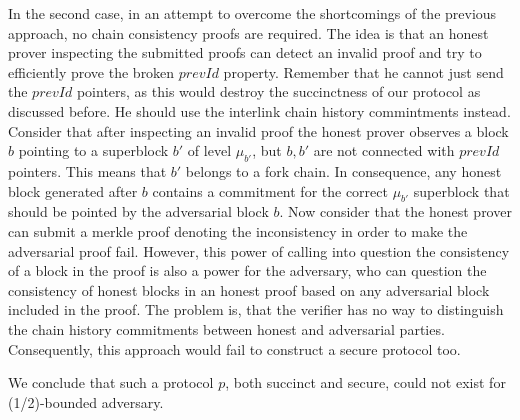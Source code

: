 In the second case, in an attempt to overcome the shortcomings of the previous approach, no chain consistency proofs are required. The idea is that an honest prover inspecting the submitted proofs can detect an invalid proof and try to efficiently prove the broken $prevId$ property. Remember that he cannot just send the $prevId$ pointers, as this would destroy the succinctness of our protocol as discussed before. He should use the interlink chain history commintments instead. Consider that after inspecting an invalid proof the honest prover observes a block $b$ pointing to a superblock $b'$ of level $\mu_{b'}$, but $b,b'$ are not connected with $prevId$ pointers. This means that $b'$ belongs to a fork chain. In consequence, any honest block generated after $b$ contains a commitment for the correct $\mu_{b'}$ superblock that should be pointed by the adversarial block $b$. Now consider that the honest prover can submit a merkle proof denoting the inconsistency in order to make the adversarial proof fail. However, this power of calling into question the consistency of a block in the proof is also a power for the adversary, who can question the consistency of honest blocks in an honest proof based on any adversarial block included in the proof. The problem is, that the verifier has no way to distinguish the chain history commitments between honest and adversarial parties. Consequently, this approach would fail to construct a secure protocol too.

We conclude that such a protocol $p$, both succinct and secure, could not exist for (1/2)-bounded adversary.


